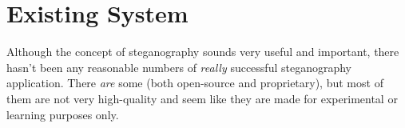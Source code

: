 \section{Existing System}

Although the concept of steganography sounds very useful and important,
there hasn't been any reasonable numbers of  \emph{really} successful
steganography application. There \emph{are} some (both open-source and
proprietary), but most of them are not very high-quality and seem like they
are made for experimental or learning purposes only.
